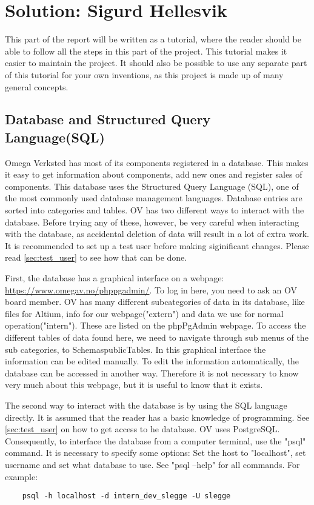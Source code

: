 \section{Solution: Sigurd Hellesvik} \label{sec:Laturd}
This part of the report will be written as a tutorial, where the reader should be able to follow all the steps in this part of the project. This tutorial makes it easier to maintain the project. It should also be possible to use any separate part of this tutorial for your own inventions, as this project is made up of many general concepts.


\subsection{Database and Structured Query Language(SQL)}
Omega Verksted has most of its components registered in a database. This makes it easy to get information about components, add new ones and register sales of components. This database uses the Structured Query Language (SQL),  one of the most commonly used database management languages. Database entries are sorted into categories and tables. OV has two different ways to interact with the database.  Before trying any of these, however, be very careful when interacting with the database, as accidental deletion of data will result in a lot of extra work. It is recommended to set up a test user before making siginificant changes. Please read \cref{sec:test_user} to see how that can be done. 

First, the database has a graphical interface on a webpage: \url{https://www.omegav.no/phppgadmin/}. To log in here, you need to ask an OV board member. OV has many different subcategories of data in its database, like files for Altium, info for our webpage("extern") and data we use for normal operation("intern"). These are listed on the phpPgAdmin webpage. To access the different tables of data found here, we need to navigate through sub menus of the sub categories, to Schemas\textrightarrow public\textrightarrow Tables. In this graphical interface the information can be edited manually. To edit the information automatically, the database can be accessed in another way. Therefore it is not necessary to know very much about this webpage, but it is useful to know that it exists.

The second way to interact with the database is by using the SQL language directly. It is assumed that the reader has a basic knowledge of programming. See \cref{sec:test_user} on how to get access to he database. OV uses PostgreSQL. Consequently, to interface the database from a computer terminal, use the "psql" command. It is necessary to specify some options: Set the host to "localhost", set username and set what database to use. See "psql --help" for all commands. For example:
\begin{verbatim}
    psql -h localhost -d intern_dev_slegge -U slegge
\end{verbatim}

